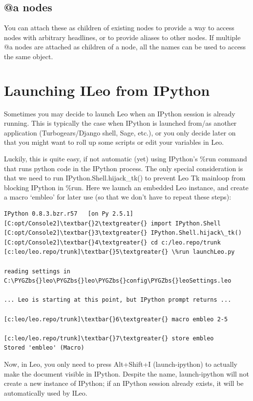 \documentclass[a4paper,10pt,english]{sphinxmanual}
\def\PYGZbs{\char`\\}
\begin{document}
\subsection{@a nodes}
\label{IPythonBridge:a-nodes}
You can attach these as children of existing nodes to provide a way to access
nodes with arbitrary headlines, or to provide aliases to other nodes. If
multiple @a nodes are attached as children of a node, all the names can be used
to access the same object.


\section{Launching ILeo from IPython}
\label{IPythonBridge:launching-ileo-from-ipython}
Sometimes you may decide to launch Leo when an IPython session is already
running. This is typically the case when IPython is launched from/as another
application (Turbogears/Django shell, Sage, etc.), or you only decide later on
that you might want to roll up some scripts or edit your variables in Leo.

Luckily, this is quite easy, if not automatic (yet) using IPython's \%run command
that runs python code in the IPython process. The only special consideration is
that we need to run IPython.Shell.hijack\_tk() to prevent Leo Tk mainloop from
blocking IPython in \%run. Here we launch an embedded Leo instance, and create a
macro `embleo' for later use (so that we don't have to repeat these steps):

\begin{Verbatim}[commandchars=\\\{\}]
IPython 0.8.3.bzr.r57   [on Py 2.5.1]
[C:opt/Console2]\textbar{}2\textgreater{} import IPython.Shell
[C:opt/Console2]\textbar{}3\textgreater{} IPython.Shell.hijack\_tk()
[C:opt/Console2]\textbar{}4\textgreater{} cd c:/leo.repo/trunk
[c:leo/leo.repo/trunk]\textbar{}5\textgreater{} \%run launchLeo.py

reading settings in C:\PYGZbs{}leo\PYGZbs{}leo\PYGZbs{}config\PYGZbs{}leoSettings.leo

... Leo is starting at this point, but IPython prompt returns ...

[c:leo/leo.repo/trunk]\textbar{}6\textgreater{} macro embleo 2-5

[c:leo/leo.repo/trunk]\textbar{}7\textgreater{} store embleo
Stored 'embleo' (Macro)
\end{Verbatim}

Now, in Leo, you only need to press Alt+Shift+I (launch-ipython) to actually
make the document visible in IPython. Despite the name, launch-ipython will not
create a new instance of IPython; if an IPython session already exists, it will
be automatically used by ILeo.
\end{document}
